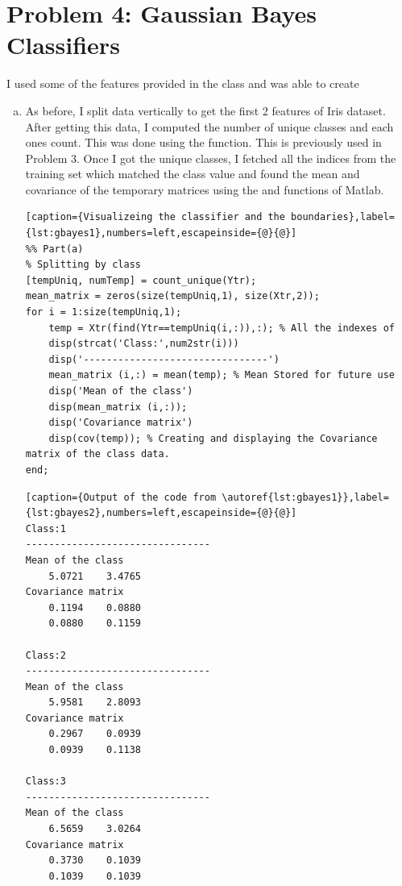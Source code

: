 \documentclass[a4paper, 11pt]{article}
\begin{document}
\section*{Problem 4: Gaussian Bayes Classifiers}
\vspace{-5pt}
I used some of the features provided in the  class and was able to create  
\begin{enumerate}[(a)]
\item As before, I split data vertically to get the first 2 features of Iris dataset. After getting this data, I computed the number of unique classes and each ones count. This was done using the  function. This is previously used in Problem 3. Once I got the unique classes, I fetched all the indices from the training set which matched the class value and found the mean and covariance of the temporary matrices using the  and  functions of Matlab.
\vspace{-20pt}
\begin{lstlisting}[caption={Visualizeing the classifier and the boundaries},label={lst:gbayes1},numbers=left,escapeinside={@}{@}]
%% Part(a)
% Splitting by class
[tempUniq, numTemp] = count_unique(Ytr);
mean_matrix = zeros(size(tempUniq,1), size(Xtr,2));
for i = 1:size(tempUniq,1);
    temp = Xtr(find(Ytr==tempUniq(i,:)),:); % All the indexes of 
    disp(strcat('Class:',num2str(i)))
    disp('--------------------------------')
    mean_matrix (i,:) = mean(temp); % Mean Stored for future use
    disp('Mean of the class')
    disp(mean_matrix (i,:));
    disp('Covariance matrix')
    disp(cov(temp)); % Creating and displaying the Covariance matrix of the class data.
end;
\end{lstlisting}
\vspace{-20pt}
\begin{lstlisting}[caption={Output of the code from \autoref{lst:gbayes1}},label={lst:gbayes2},numbers=left,escapeinside={@}{@}]
Class:1
--------------------------------
Mean of the class
    5.0721    3.4765
Covariance matrix
    0.1194    0.0880
    0.0880    0.1159

Class:2
--------------------------------
Mean of the class
    5.9581    2.8093
Covariance matrix
    0.2967    0.0939
    0.0939    0.1138

Class:3
--------------------------------
Mean of the class
    6.5659    3.0264
Covariance matrix
    0.3730    0.1039
    0.1039    0.1039
\end{lstlisting}


\end{enumerate}
\end{document}
